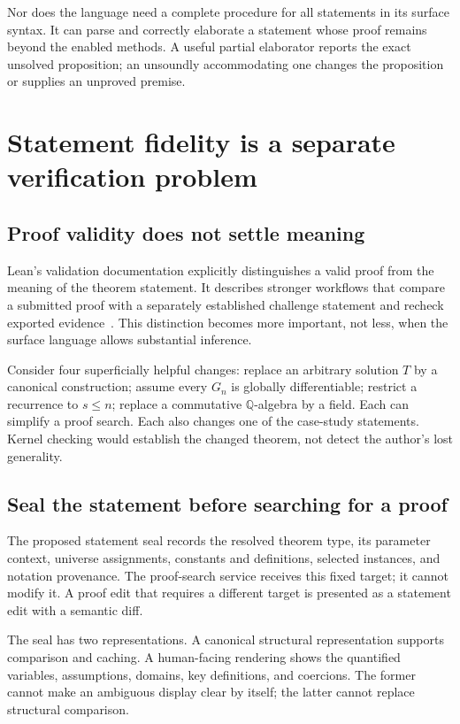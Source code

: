 \documentclass[11pt,a4paper]{article}
\newcommand{\Q}{\mathbb Q}
\theoremstyle{remark}
\begin{document}
Nor does the language need a complete procedure for all statements in its surface syntax. It can parse and correctly elaborate a statement whose proof remains beyond the enabled methods. A useful partial elaborator reports the exact unsolved proposition; an unsoundly accommodating one changes the proposition or supplies an unproved premise.

\section{Statement fidelity is a separate verification problem}
\label{sec:fidelity}

\subsection{Proof validity does not settle meaning}

Lean's validation documentation explicitly distinguishes a valid proof from the meaning of the theorem statement. It describes stronger workflows that compare a submitted proof with a separately established challenge statement and recheck exported evidence~\cite{lean-validation}. This distinction becomes more important, not less, when the surface language allows substantial inference.

Consider four superficially helpful changes: replace an arbitrary solution $T$ by a canonical construction; assume every $G_n$ is globally differentiable; restrict a recurrence to $s\le n$; replace a commutative $\Q$-algebra by a field. Each can simplify a proof search. Each also changes one of the case-study statements. Kernel checking would establish the changed theorem, not detect the author's lost generality.

\subsection{Seal the statement before searching for a proof}

The proposed statement seal records the resolved theorem type, its parameter context, universe assignments, constants and definitions, selected instances, and notation provenance. The proof-search service receives this fixed target; it cannot modify it. A proof edit that requires a different target is presented as a statement edit with a semantic diff.

The seal has two representations. A canonical structural representation supports comparison and caching. A human-facing rendering shows the quantified variables, assumptions, domains, key definitions, and coercions. The former cannot make an ambiguous display clear by itself; the latter cannot replace structural comparison.
\end{document}
